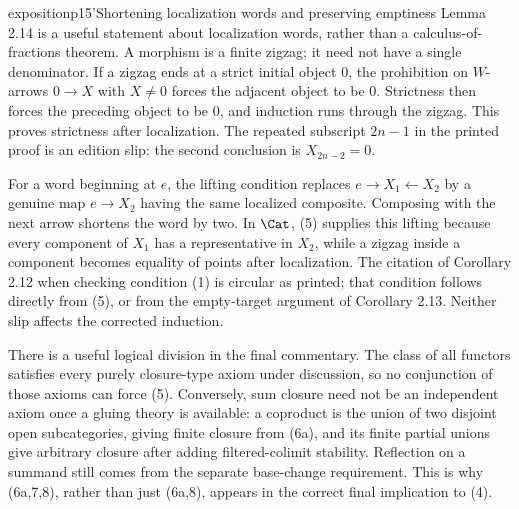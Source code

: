 \begin{dcomment}{exposition}{p15'}{Shortening localization words and preserving emptiness}
Lemma 2.14 is a useful statement about localization words, rather than a calculus-of-fractions theorem. A morphism is a finite zigzag; it need not have a single denominator. If a zigzag ends at a strict initial object $0$, the prohibition on $W$-arrows $0\to X$ with $X\ne0$ forces the adjacent object to be $0$. Strictness then forces the preceding object to be $0$, and induction runs through the zigzag. This proves strictness after localization. The repeated subscript $2n-1$ in the printed proof is an edition slip: the second conclusion is $X_{2n-2}=0$.

For a word beginning at $e$, the lifting condition replaces $e\to X_1\leftarrow X_2$ by a genuine map $e\to X_2$ having the same localized composite. Composing with the next arrow shortens the word by two. In $\Cat$, (5) supplies this lifting because every component of $X_1$ has a representative in $X_2$, while a zigzag inside a component becomes equality of points after localization. The citation of Corollary 2.12 when checking condition (1) is circular as printed; that condition follows directly from (5), or from the empty-target argument of Corollary 2.13. Neither slip affects the corrected induction.

There is a useful logical division in the final commentary. The class of all functors satisfies every purely closure-type axiom under discussion, so no conjunction of those axioms can force (5). Conversely, sum closure need not be an independent axiom once a gluing theory is available: a coproduct is the union of two disjoint open subcategories, giving finite closure from (6a), and its finite partial unions give arbitrary closure after adding filtered-colimit stability. Reflection on a summand still comes from the separate base-change requirement. This is why (6a,7,8), rather than just (6a,8), appears in the correct final implication to (4).
\end{dcomment}

